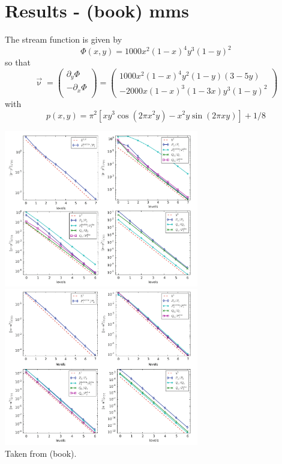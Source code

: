 \newpage
\section*{Results - \textcite{john16} (book) mms}

The stream function is given by
\[
\Phi(x,y) = 1000x^2(1-x)^4 y^3 (1-y)^2
\]
so that
\[
\vec\upnu = 
\left(
\begin{array}{c}
\partial_y \Phi \\
-\partial_x \Phi \\
\end{array}
\right)
=
\left(
\begin{array}{c}
1000 x^2 (1-x)^4 y^2 (1-y) (3-5y) \\
-2000 x (1-x)^3 (1-3x) y^3 (1-y)^2 
\end{array}
\right)
\]
with
\[
p(x,y)=\pi^2 [xy^3 \cos(2\pi x^2 y) - x^2y \sin(2\pi xy) ] +1/8
\]


\begin{center} 
\includegraphics[width=8.5cm]{python_codes/fieldstone_120/images/john_a}
\includegraphics[width=8.5cm]{python_codes/fieldstone_120/images/john_b}\\
{\captionfont Taken from \textcite{john16} (book).}
\end{center} 




